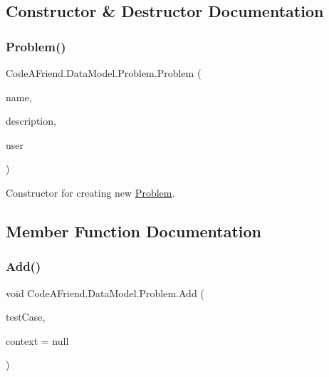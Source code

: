 \subsection{Constructor \& Destructor Documentation}
\mbox{\label{class_code_a_friend_1_1_data_model_1_1_problem_a0bd8bd69a5f4d301be856222262fe7fc}} 
\subsubsection{\texorpdfstring{Problem()}{Problem()}}
{\footnotesize\ttfamily Code\+A\+Friend.\+Data\+Model.\+Problem.\+Problem (\begin{DoxyParamCaption}\item[{string}]{name,  }\item[{string}]{description,  }\item[{\mbox{\hyperlink{class_code_a_friend_1_1_data_model_1_1_user}{User}}}]{user }\end{DoxyParamCaption})}



Constructor for creating new \mbox{\hyperlink{class_code_a_friend_1_1_data_model_1_1_problem}{Problem}}.



\subsection{Member Function Documentation}
\mbox{\label{class_code_a_friend_1_1_data_model_1_1_problem_a3ca779158ac6d2f5ca49206214722d27}} 
\subsubsection{\texorpdfstring{Add()}{Add()}\hspace{0.1cm}{\footnotesize\ttfamily [1/3]}}
{\footnotesize\ttfamily void Code\+A\+Friend.\+Data\+Model.\+Problem.\+Add (\begin{DoxyParamCaption}\item[{\mbox{\hyperlink{class_code_a_friend_1_1_data_model_1_1_test_case}{Test\+Case}}}]{test\+Case,  }\item[{Db\+Context}]{context = {\ttfamily null} }\end{DoxyParamCaption})}




